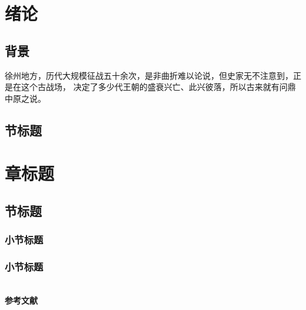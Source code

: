 
\section{绪论}

\subsection{背景}

\par 徐州地方，历代大规模征战五十余次，是非曲折难以论说，但史家无不注意到，正是在这个古战场，
决定了多少代王朝的盛衰兴亡、此兴彼落，所以古来就有问鼎中原之说。

\subsection{节标题}

\section{章标题}

\subsection{节标题}

\subsubsection{小节标题}

\subsubsection{小节标题}

\clearpage
{}
\begin{center}
    ~\\[-1.5em]
    \textbf{参考文献}
\end{center}

{\normalfont{}\setlength{\baselineskip}{14pt}
\renewcommand{\refname}{\vspace{-\baselineskip}}
}